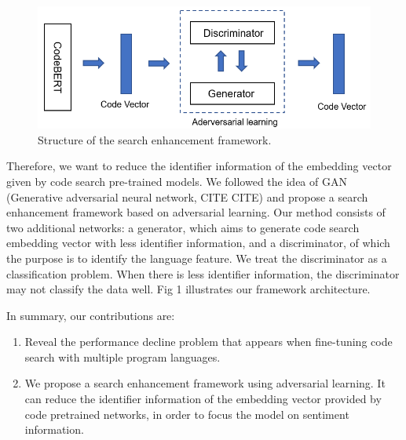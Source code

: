 \begin{figure}[htb]
	\centering
	\includegraphics[width=1\linewidth]{imgs/structure.png}
	\caption{Structure of the search enhancement framework.}
	\label{fig:structure}
\end{figure}

Therefore, we want to reduce the identifier information of the embedding vector given by code search pre-trained models. We followed the idea of GAN (Generative adversarial neural network, CITE CITE) and propose a search enhancement framework based on adversarial learning. Our method consists of two additional networks: a generator, which aims to generate code search embedding vector with less identifier information, and a discriminator, of which the purpose is to identify the language feature. We treat the discriminator as a classification problem. When there is less identifier information, the discriminator may not classify the data well. Fig 1 illustrates our framework architecture.

In summary, our contributions are:
\begin{enumerate} 
\item Reveal the performance decline problem that appears when fine-tuning code search with multiple program languages.
\item We propose a search enhancement framework using adversarial learning. It can reduce the identifier information of the embedding vector provided by code pretrained networks, in order to focus the model on sentiment information.
\end{enumerate} 


